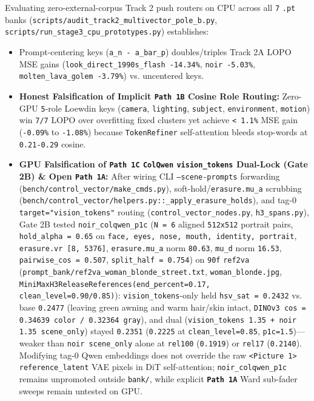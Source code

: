 \documentclass[10pt]{article}
\begin{document}
Evaluating zero-external-corpus Track 2 push routers on CPU across all \texttt{7} \texttt{.pt} banks (\texttt{scripts/audit\_track2\_multivector\_pole\_b.py}, \texttt{scripts/run\_stage3\_cpu\_prototypes.py}) establishes:
\begin{itemize}[leftmargin=*]
\item Prompt-centering keys (\texttt{a\_n - a\_bar\_p}) doubles/triples Track 2A LOPO MSE gains (\texttt{look\_direct\_1990s\_flash -14.34\%}, \texttt{noir -5.03\%}, \texttt{molten\_lava\_golem -3.79\%}) vs. uncentered keys.
\item \textbf{Honest Falsification of Implicit \texttt{Path 1B} Cosine Role Routing:} Zero-GPU \texttt{5}-role Loewdin keys (\texttt{camera}, \texttt{lighting}, \texttt{subject}, \texttt{environment}, \texttt{motion}) win \texttt{7/7} LOPO over overfitting fixed clusters yet achieve \texttt{< 1.1\%} MSE gain (\texttt{-0.09\%} to \texttt{-1.08\%}) because \texttt{TokenRefiner} self-attention bleeds stop-words at \texttt{0.21-0.29} cosine.
\item \textbf{GPU Falsification of \texttt{Path 1C} \texttt{ColQwen} \texttt{vision\_tokens} Dual-Lock (Gate 2B) \& Open \texttt{Path 1A}:} After wiring CLI \texttt{--scene-prompts} forwarding (\texttt{bench/control\_vector/make\_cmds.py}), soft-hold/\texttt{erasure.mu\_a} scrubbing (\texttt{bench/control\_vector/helpers.py::\_apply\_erasure\_holds}), and tag-0 \texttt{target="vision\_tokens"} routing (\texttt{control\_vector\_nodes.py}, \texttt{h3\_spans.py}), Gate 2B tested \texttt{noir\_colqwen\_p1c} (\texttt{N = 6} aligned \texttt{512x512} portrait pairs, \texttt{hold\_alpha = 0.65} on \texttt{face, eyes, nose, mouth, identity, portrait}, \texttt{erasure.vr [8, 5376]}, \texttt{erasure.mu\_a} norm \texttt{80.63}, \texttt{mu\_d} norm \texttt{16.53}, \texttt{pairwise\_cos = 0.507}, \texttt{split\_half = 0.754}) on \texttt{90f} \texttt{ref2va} (\texttt{prompt\_bank/ref2va\_woman\_blonde\_street.txt}, \texttt{woman\_blonde.jpg}, \texttt{MiniMaxH3ReleaseReferences(end\_percent=0.17, clean\_level=0.90/0.85)}): \texttt{vision\_tokens}-only held \texttt{hsv\_sat = 0.2432} vs. base \texttt{0.2477} (leaving green awning and warm hair/skin intact, \texttt{DINOv3 cos = 0.34639 color / 0.32364 gray}), and dual (\texttt{vision\_tokens 1.35 + noir 1.35 scene\_only}) stayed \texttt{0.2351} (\texttt{0.2225} at \texttt{clean\_level=0.85}, \texttt{p1c=1.5})---weaker than \texttt{noir scene\_only} alone at \texttt{rel100} (\texttt{0.1919}) or \texttt{rel17} (\texttt{0.2140}). Modifying tag-0 Qwen embeddings does not override the raw \texttt{<Picture 1>} \texttt{reference\_latent} VAE pixels in DiT self-attention; \texttt{noir\_colqwen\_p1c} remains unpromoted outside \texttt{bank/}, while explicit \textbf{\texttt{Path 1A}} Ward sub-fader sweeps remain untested on GPU.
\end{itemize}
\end{document}
